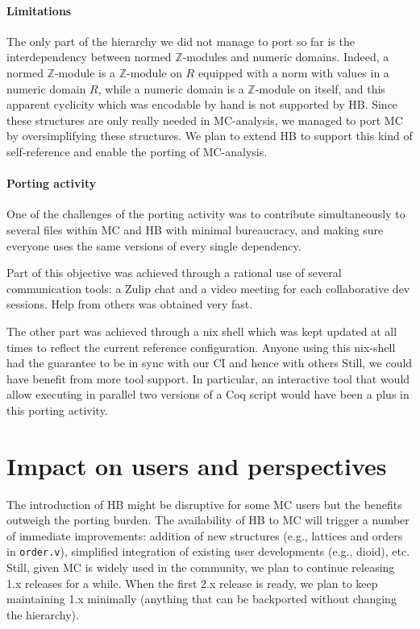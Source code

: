 \documentclass{easychair}
\def\MC{{\sf MC}}
\def\HB{{\sf HB}}
\begin{document}
\paragraph{Limitations}

The only part of the hierarchy we did not manage to port so far is the
interdependency between normed $\mathbb{Z}$-modules and numeric domains.
Indeed, a normed $\mathbb{Z}$-module is a $\mathbb{Z}$-module on $R$
equipped with a norm with values in a numeric domain $R$,
while a numeric domain is a $\mathbb{Z}$-module on itself, and this apparent
cyclicity which was encodable by hand is not supported by \HB{}.
Since these structures are only really needed in \MC{}-analysis,
we managed to port \MC{} by oversimplifying these structures.
We plan to extend \HB{} to support this kind of self-reference
and enable the porting of \MC{}-analysis.

\paragraph{Porting activity}

One of the challenges of the porting activity was to contribute simultaneously
to several files within \MC{} and \HB{} with minimal bureaucracy, and making sure
everyone uses the same versions of every single dependency.

Part of this objective was achieved through a rational use of several
communication tools: a Zulip chat and a video meeting for each
collaborative dev sessions. Help from others was obtained very fast.

The other part was achieved through a nix shell which was kept updated
at all times to reflect the current reference configuration.
Anyone using this nix-shell had the guarantee to be in sync with our CI
and hence with others
Still, we could have benefit from more tool support. In particular,
an interactive tool that would allow executing in parallel   
two versions of a Coq script would have been a plus in this porting activity.

\section{Impact on users and perspectives}

The introduction of \HB{} might be disruptive for some \MC{} users
but the benefits outweigh the porting burden.
%
The availability of \HB{} to \MC{} will trigger a number of immediate
improvements: addition of new structures (e.g., lattices and orders in
\verb!order.v!), simplified integration of existing user developments
(e.g., dioid), etc.
%
Still, given \MC{} is widely used in the community, we plan to continue
releasing 1.x releases for a while. When the first 2.x release is ready,
we plan to keep maintaining 1.x minimally (anything that can be backported
without changing the hierarchy).

\label{sect:bib}

%
%
%


\end{document}
